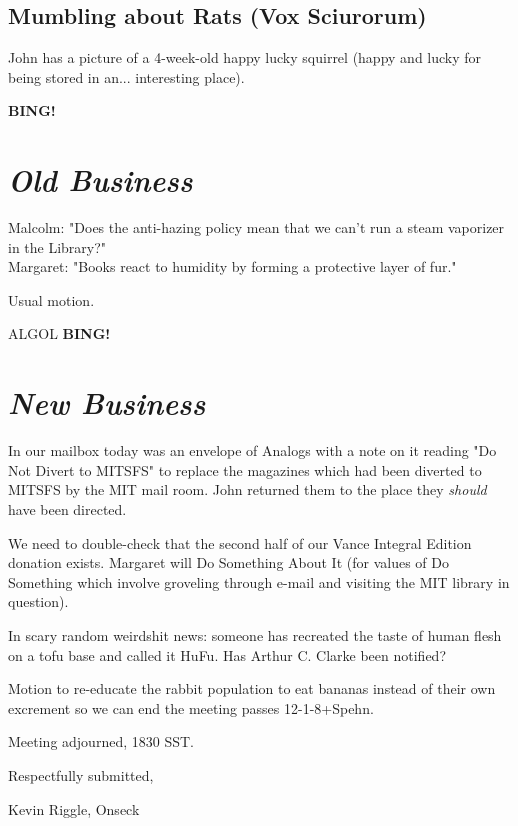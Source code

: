 \documentclass[10pt]{article}
\newcommand{\bing}{{\bf BING!} }
\newcommand{\goto}[1]{\bing \vskip 12pt \section*{{\em{#1}}}}
\begin{document}
\subsection*{Mumbling about Rats (Vox Sciurorum)}
John has a picture of a 4-week-old happy lucky squirrel (happy and lucky for being stored 
in an... interesting place).

\goto{Old Business}
Malcolm: "Does the anti-hazing policy mean that we can't run a steam vaporizer in the Library?"\\
Margaret: "Books react to humidity by forming a protective layer of fur."

Usual motion.

ALGOL
\goto{New Business}
In our mailbox today was an envelope of Analogs with a note on it reading "Do Not Divert to MITSFS"
to replace the magazines which had been diverted to MITSFS by the MIT mail room.  John returned
them to the place they \emph{should} have been directed.

We need to double-check that the second half of our Vance Integral Edition donation exists.
Margaret will Do Something About It (for values of Do Something which involve groveling through
e-mail and visiting the MIT library in question).

In scary random weirdshit news: someone has recreated the taste of human flesh on a tofu base and
called it HuFu.  Has Arthur C. Clarke been notified?

Motion to re-educate the rabbit population to eat bananas instead of their own excrement so
we can end the meeting passes 12-1-8+Spehn.

\vspace{12pt}

\noindent
Meeting adjourned, 1830 SST.

\vspace{18pt}

\centerline{Respectfully submitted,}
\centerline{Kevin Riggle, Onseck}
\end{document}
